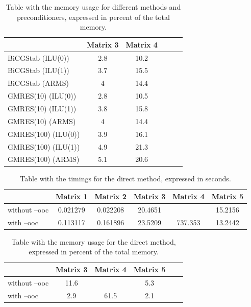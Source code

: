 \documentclass{article}
\begin{document}
	\begin{table}[h]
		\centering
		\begin{tabular}{|l|c|c|c|c|c|}
			\hline
				 & Matrix 3 & Matrix 4 \\ \hline 
			BiCGStab (ILU(0)) & 2.8 & 10.2  \\ \hline
			BiCGStab (ILU(1)) & 3.7 & 15.5  \\ \hline
			BiCGStab (ARMS)  & 4 & 14.4 \\ \hline
			GMRES(10) (ILU(0)) &  2.8 & 10.5 \\ \hline
			GMRES(10) (ILU(1)) & 3.8 & 15.8 \\ \hline
			GMRES(10) (ARMS) & 4 & 14.4 \\ \hline
			GMRES(100) (ILU(0)) & 3.9 & 16.1 \\ \hline
			GMRES(100) (ILU(1)) & 4.9 & 21.3 \\ \hline
			GMRES(100) (ARMS) & 5.1 & 20.6 \\ \hline
		\end{tabular}
		\caption{Table with the memory usage for different methods and preconditioners, expressed in percent of the total memory.}
	\end{table}
	
	\begin{table}[h]
		\centering
		\begin{tabular}{|l|c|c|c|c|c|}
			\hline
						& Matrix 1 & Matrix 2 & Matrix 3 & Matrix 4 & Matrix 5 \\ \hline 
			without --ooc & 0.021279 & 0.022208 & 20.4651 &   & 15.2156 \\ \hline
			with --ooc & 0.113117 & 0.161896 & 23.5209 & 737.353 & 13.2442 \\ \hline
		\end{tabular}
		\caption{Table with the timings for the direct method, expressed in seconds.}
	\end{table}
	
	\begin{table}[h]
		\centering
		\begin{tabular}{|l|c|c|c|c|c|}
			\hline
			&  Matrix 3 & Matrix 4 & Matrix 5 \\ \hline 
			without --ooc & 11.6 &  & 5.3 \\ \hline
			with --ooc & 2.9 & 61.5 & 2.1 \\ \hline
		\end{tabular}
		\caption{Table with the memory usage for the direct method, expressed in percent of the total memory.}
	\end{table}
	
\end{document}
